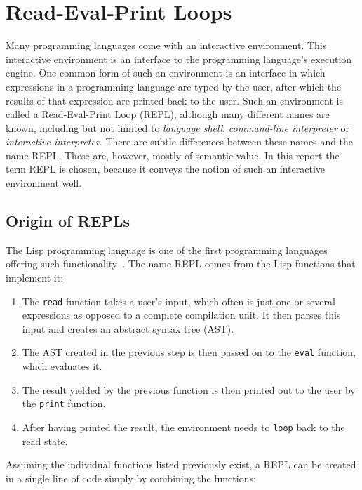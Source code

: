 \section{Read-Eval-Print Loops}
\label{sec:repl}

Many programming languages come with an interactive environment. This
interactive environment is an interface to the programming language's execution
engine. One common form of such an environment is an interface in which
expressions in a programming language are typed by the user, after which the
results of that expression are printed back to the user. Such an environment is
called a Read-Eval-Print Loop (REPL), although many different names are known,
including but not limited to \emph{language shell},
\emph{command-line interpreter} or \emph{interactive interpreter}. There
are subtle differences between these names and the name REPL. These are,
however, mostly of semantic value. In this report the term REPL is chosen,
because it conveys the notion of such an interactive environment well.

\subsection{Origin of REPLs}
\label{repl-origin}

The Lisp programming language is one of the first programming
languages offering such functionality~\cite{Noyes92}. The name REPL comes from
the Lisp functions that implement it:

\begin{enumerate}
  \item The \texttt{read} function takes a user's input, which often is just one
    or several expressions as opposed to a complete compilation unit. It then
    parses this input and creates an abstract syntax tree (AST).
  \item The AST created in the previous step is then passed on to the
    \texttt{eval} function, which evaluates it.
  \item The result yielded by the previous function is then printed out to the
    user by the \texttt{print} function.
  \item After having printed the result, the environment needs to \texttt{loop}
    back to the read state.
\end{enumerate}

Assuming the individual functions listed previously exist, a REPL can be created
in a single line of code simply by combining the functions:

